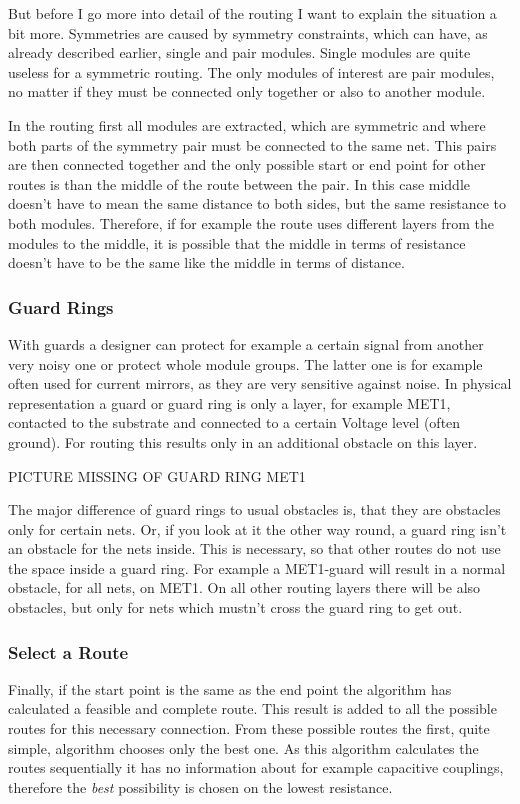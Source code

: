 But before I go more into detail of the routing I want to explain the situation a bit more. Symmetries are caused by symmetry constraints, which can have, as already described earlier, single and pair modules. Single modules are quite useless for a symmetric routing. The only modules of interest are pair modules, no matter if they must be connected only together or also to another module.

In the routing first all modules are extracted, which are symmetric and where both parts of the symmetry pair must be connected to the same net. This pairs are then connected together and the only possible start or end point for other routes is than the middle of the route between the pair. In this case middle doesn't have to mean the same distance to both sides, but the same resistance to both modules. Therefore, if for example the route uses different layers from the modules to the middle, it is possible that the middle in terms of resistance doesn't have to be the same like the middle in terms of distance.

\subsubsection{Guard Rings}
With guards a designer can protect for example a certain signal from another very noisy one or protect whole module groups. The latter one is for example often used for current mirrors, as they are very sensitive against noise. In physical representation a guard or guard ring is only a layer, for example MET1, contacted to the substrate and connected to a certain Voltage level (often ground). For routing this results only in an additional obstacle on this layer.

PICTURE MISSING OF GUARD RING MET1

The major difference of guard rings to usual obstacles is, that they are obstacles only for certain nets. Or, if you look at it the other way round, a guard ring isn't an obstacle for the nets inside. This is necessary, so that other routes do not use the space inside a guard ring. For example a MET1-guard will result in a normal obstacle, for all nets, on MET1. On all other routing layers there will be also obstacles, but only for nets which mustn't cross the guard ring to get out.

\subsubsection{Select a Route}
Finally, if the start point is the same as the end point the algorithm has calculated a feasible and complete route. This result is added to all the possible routes for this necessary connection. From these possible routes the first, quite simple, algorithm chooses only the best one. As this algorithm calculates the routes sequentially it has no information about for example capacitive couplings, therefore the \textit{best} possibility is chosen on the lowest resistance.

